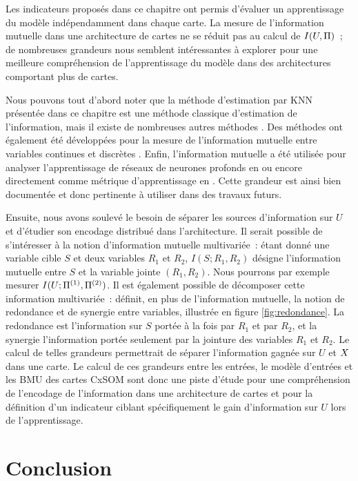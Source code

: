 \documentclass[../main]{subfiles}
\begin{document}
Les indicateurs proposés dans ce chapitre ont permis d'évaluer un apprentissage du modèle indépendamment dans chaque carte. 
La mesure de l'information mutuelle dans une architecture de cartes ne se réduit pas au calcul de $I(U,\Pi)$~; de nombreuses grandeurs nous semblent intéressantes à explorer pour une meilleure compréhension de l'apprentissage du modèle dans des architectures comportant plus de cartes.

Nous pouvons tout d'abord noter que la méthode d'estimation par KNN présentée dans ce chapitre est une méthode classique d'estimation de l'information, mais il existe de nombreuses autres méthodes \parencite{Doquire2012ACO}. Des méthodes ont également été développées pour la mesure de l'information mutuelle entre variables continues et discrètes \parencite{ross_mutual_2014, Gao2017EstimatingMI}. Enfin, l'information mutuelle a été utilisée pour analyser l'apprentissage de réseaux de neurones profonds en \cite{ShwartzZiv2017OpeningTB} ou encore directement comme métrique d'apprentissage en \cite{Hjelm2018LearningDR}.
Cette grandeur est ainsi bien documentée et donc pertinente à utiliser dans des travaux futurs.

Ensuite, nous avons soulevé le besoin de séparer les sources d'information sur $U$ et d'étudier son encodage distribué dans l'architecture. Il serait possible de s'intéresser à la notion d'information mutuelle multivariée~: étant donné une variable cible $S$ et deux variables $R_1$ et $R_2$, $I(S;R_1,R_2)$ désigne l'information mutuelle entre $S$ et la variable jointe $(R_1,R_2)$. 
Nous pourrons par exemple mesurer $I(U; \Pi^{({1})}, \Pi^{({2})})$.
Il est également possible de décomposer cette information multivariée~: \cite{williams_nonnegative_2010} définit, en plus de l'information mutuelle, la notion de redondance et de synergie entre variables, illustrée en figure \ref{fig:redondance}.
La redondance est l'information sur $S$ portée à la fois par $R_1$ et par $R_2$, et la synergie l'information portée seulement par la jointure des variables $R_1$ et $R_2$. Le calcul de telles grandeurs permettrait de séparer l'information gagnée sur $U$ et $X$ dans une carte.
Le calcul de ces grandeurs entre les entrées, le modèle d'entrées et les BMU des cartes CxSOM sont donc une piste d'étude pour une compréhension de l'encodage de l'information dans une architecture de cartes et pour la définition d'un indicateur ciblant spécifiquement le gain d'information sur $U$ lors de l'apprentissage.


\section{Conclusion}
\end{document}
